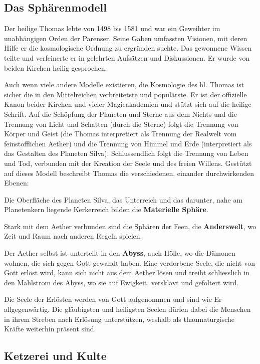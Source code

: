 \documentclass[10pt,twoside,twocolumn,openany]{book}
\begin{document}
\begin{multicols}{2}
	
	\subsection{Das Sphärenmodell}
	Der heilige Thomas lebte von 1498 bis 1581 und war ein Geweihter im unabhängigen Orden der Parenser. Seine Gaben umfassten Visionen, mit deren Hilfe er die kosmologische Ordnung zu ergründen suchte. Das gewonnene Wissen teilte und verfeinerte er in gelehrten Aufsätzen und Diskussionen. Er wurde von beiden Kirchen heilig gesprochen.
	
	Auch wenn viele andere Modelle existieren, die Kosmologie des hl. Thomas ist sicher die in den Mittelreichen verbreitetste und populärste. Er ist der offizielle Kanon beider Kirchen und vieler Magieakademien und stützt sich auf die heilige Schrift.
	Auf die Schöpfung der Planeten und Sterne aus dem Nichts und die Trennung von Licht und Schatten (durch die Sterne) folgt die Trennung von Körper und Geist (die Thomas interpretiert als Trennung der Realwelt vom feinstofflichen Aether) und die Trennung von Himmel und Erde (interpretiert als das Gestalten des Planeten Silva). Schlussendlich folgt die Trennung von Leben und Tod, verbunden mit der Kreation der Seele und des freien Willens. Gestützt auf dieses Modell beschreibt Thomas die verschiedenen, einander durchwirkenden Ebenen:
	
	Die Oberfläche des Planeten Silva, das Unterreich und das darunter, nahe am Planetenkern liegende Kerkerreich bilden die \textbf{Materielle Sphäre}.
	
	Stark mit dem Aether verbunden sind die Sphären der Feen, die \textbf{Anderswelt}, wo Zeit und Raum nach anderen Regeln spielen.
	
	Der Aether selbst ist unterteilt in den \textbf{Abyss}, auch Hölle, wo die Dämonen wohnen, die sich gegen Gott gewandt haben. Eine verdorbene Seele, die nicht von Gott erlöst wird, kann sich nicht aus dem Aether lösen und treibt schliesslich in den Mahlstrom des Abyss, wo sie auf Ewigkeit, versklavt und gefoltert wird.
	
	Die Seele der Erlösten werden von Gott aufgenommen und sind wie Er allgegenwärtig. Die gläubigsten und heiligsten Seelen dürfen dabei die Menschen in ihrem Streben nach Erlösung unterstützen, weshalb als thaumaturgische Kräfte weiterhin präsent sind.

	\subsection{Ketzerei und Kulte}


\end{multicols}
\end{document}
